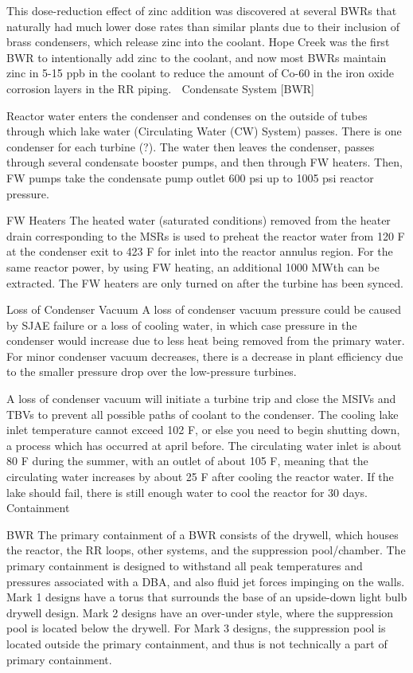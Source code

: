 \documentclass[10pt]{article}
\begin{document}
This dose-reduction effect of zinc addition was discovered at several BWRs that naturally had much lower dose rates than similar plants due to their inclusion of brass condensers, which release zinc into the coolant. Hope Creek was the first BWR to intentionally add zinc to the coolant, and now most BWRs maintain zinc in 5-15 ppb in the coolant to reduce the amount of Co-60 in the iron oxide corrosion layers in the RR piping.  

Condensate System [BWR]

Reactor water enters the condenser and condenses on the outside of tubes through which lake water (Circulating Water (CW) System) passes. There is one condenser for each turbine (?). The water then leaves the condenser, passes through several condensate booster pumps, and then through FW heaters. Then, FW pumps take the condensate pump outlet 600 psi up to 1005 psi reactor pressure. 

FW Heaters
The heated water (saturated conditions) removed from the heater drain corresponding to the MSRs is used to preheat the reactor water from 120 F at the condenser exit to 423 F for inlet into the reactor annulus region. For the same reactor power, by using FW heating, an additional 1000 MWth can be extracted. The FW heaters are only turned on after the turbine has been synced. 

Loss of Condenser Vacuum
A loss of condenser vacuum pressure could be caused by SJAE failure or a loss of cooling water, in which case pressure in the condenser would increase due to less heat being removed from the primary water. For minor condenser vacuum decreases, there is a decrease in plant efficiency due to the smaller pressure drop over the low-pressure turbines. 

A loss of condenser vacuum will initiate a turbine trip and close the MSIVs and TBVs to prevent all possible paths of coolant to the condenser. The cooling lake inlet temperature cannot exceed 102 F, or else you need to begin shutting down, a process which has occurred at april before. The circulating water inlet is about 80 F during the summer, with an outlet of about 105 F, meaning that the circulating water increases by about 25 F after cooling the reactor water. If the lake should fail, there is still enough water to cool the reactor for 30 days. 

Containment

BWR
The primary containment of a BWR consists of the drywell, which houses the reactor, the RR loops, other systems, and the suppression pool/chamber. The primary containment is designed to withstand all peak temperatures and pressures associated with a DBA, and also fluid jet forces impinging on the walls. Mark 1 designs have a torus that surrounds the base of an upside-down light bulb drywell design. Mark 2 designs have an over-under style, where the suppression pool is located below the drywell.  For Mark 3 designs, the suppression pool is located outside the primary containment, and thus is not technically a part of primary containment. 
\end{document}

